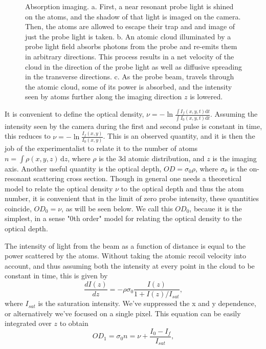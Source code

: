 \documentclass[12pt]{iopart}
\begin{document}
\begin{figure}
\caption{Absorption imaging. a. First, a near resonant probe light is shined on the atoms, and the shadow of that light is imaged on the camera. Then, the atoms are allowed to escape their trap and and image of just the probe light is taken. b. An atomic cloud illuminated by a probe light field absorbs photons from the probe and re-emits them in arbitrary directions. This process results in a net velocity of the cloud in the direction of the probe light as well as diffusive spreading in the transverse directions. c. As the probe beam, travels through the atomic cloud, some of its power is absorbed, and the intensity seen by atoms further along the imaging direction $z$ is lowered.  }  
\label{fig:absorptionIntor}
\end{figure}
\par It is convenient to define the optical density, $\nu=-\ln{\frac{\int{I_f(x,y,t)}\mathrm{d}t}{\int{I_0(x,y,t)}\mathrm{d}t}}$. Assuming the intensity seen by the camera during the first and second pulse is constant in time, this reduces to $\nu=-\ln{\frac{I_f(x,y)}{I_0(x,y)}}$. This is an observed quantity, and it is then the job of the experimentalist to relate it to the number of atoms $n = \int \rho\left(x,y,z\right) \,\mathrm{d}z$, where $\rho$ is the 3d atomic distribution, and $z$ is the imaging axis. Another useful quantity is the optical depth, $OD=\sigma_0\rho$, where $\sigma_0$ is the on-resonant scattering cross section. Though in general one needs a theoretical model to relate the optical density $\nu$ to the optical depth  and thus the atom number, it is convenient that in the limit of zero probe intensity, these quantities coincide, $OD_0=\nu$, as will be seen below. We call this $OD_0$, becaue it is the simplest, in a sense "0th order" model for relating the optical density to the optical depth.
\par The intensity of light from the beam as a function of distance is equal to the power scattered by the atoms. Without taking the atomic recoil velocity into account, and thus assuming both the intensity at every point in the cloud to be constant in time, this is given by \cite{Reinaudi07}
\begin{equation}
\frac{dI(z)}{dz}=-\rho\sigma_0\frac{I(z)}{1+I(z)/I_{sat}},
\end{equation}
 where  $I_{sat}$ is the saturation intensity. We've suppressed the x and y dependence, or alternatively we've focused on a single pixel.  This equation can be easily integrated over $z$ to obtain
\begin{equation} 
OD_1 =\sigma_0 n = \nu + \frac{I_0-I_f}{I_{sat}},
\label{eq2}
\end{equation}
\end{document}
